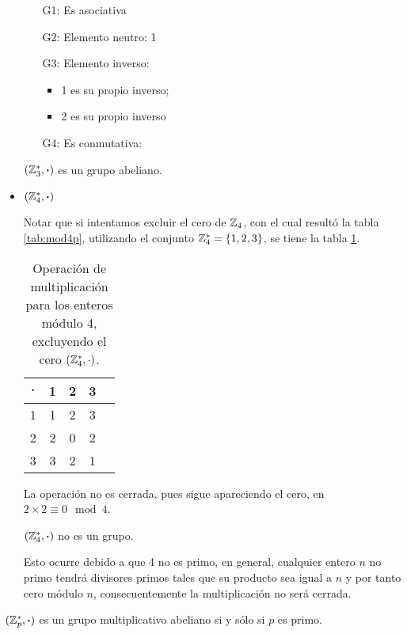 \begin{itemize}
	\begin{itemize}
		\item[G1:] Es asociativa \cmark
		\item[G2:] Elemento neutro: 1 \cmark
		\item[G3:] Elemento inverso: \cmark
		\begin{itemize}
			\item 1 es su propio inverso;
			\item 2 es su propio inverso
		\end{itemize}
		\item[G4:] Es conmutativa: \cmark
	\end{itemize}
	
	\begin{center}
		$(\mathbb{Z}^{*}_3, \boldsymbol{\cdot})$ es un grupo abeliano.
	\end{center}
	
	\item $(\mathbb{Z}^{*}_4, \boldsymbol{\cdot})$
	
	Notar que si intentamos excluir el cero de $\mathbb{Z}_4$, con el cual resultó la tabla \ref{tab:mod4p}, utilizando el conjunto $\mathbb{Z}^{*}_4 = \{ 1, 2, 3 \}$, se tiene la tabla \ref{tab:mod4pa}.
	
	\begin{table}[H]
		\centering
		\begin{tabular}{c|cccc}
			$\boldsymbol{\cdot}$ & 1 & 2 & 3\\
			\hline
			1 & 1 & 2 & 3\\
			2 & 2 & 0 & 2\\
			3 & 3 & 2 & 1
		\end{tabular}
		\caption{Operación de multiplicación para los enteros módulo 4, excluyendo el cero $(\mathbb{Z}^{*}_4, \cdot)$.}
		\label{tab:mod4pa}
	\end{table}
	La operación no es cerrada, pues sigue apareciendo el cero, en $2 \times 2 \equiv 0 \mod 4$.
	
	\begin{center}
		$(\mathbb{Z}^{*}_4, \boldsymbol{\cdot})$ no es un grupo.
	\end{center}
	
	Esto ocurre debido a que 4 no es primo, en general, cualquier entero $n$ no primo tendrá divisores primos tales que su producto sea igual a $n$ y por tanto cero módulo $n$, consecuentemente la multiplicación no será cerrada.
\end{itemize}

\begin{proposition} \label{prop:primo}
	$(\mathbb{Z}_p^{*}, \boldsymbol{\cdot})$ es un grupo multiplicativo abeliano si y sólo si $p$ es primo.
\end{proposition}

